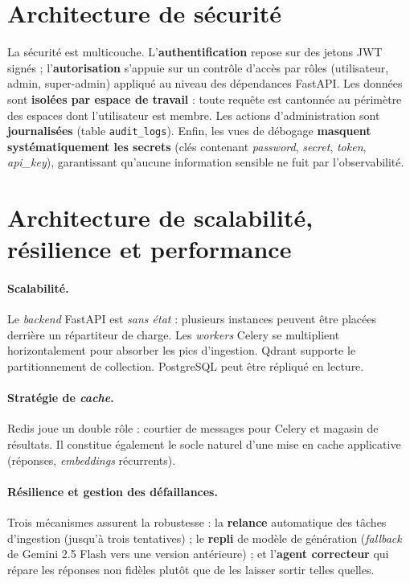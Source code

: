 \documentclass[12pt,a4paper,oneside]{report}
\newcommand{\code}[1]{\texttt{\small #1}}
\begin{document}
\section{Architecture de sécurité}
La sécurité est multicouche. L'\textbf{authentification} repose sur des jetons
JWT signés ; l'\textbf{autorisation} s'appuie sur un contrôle d'accès par rôles
(utilisateur, admin, super-admin) appliqué au niveau des dépendances FastAPI. Les
données sont \textbf{isolées par espace de travail} : toute requête est cantonnée
au périmètre des espaces dont l'utilisateur est membre. Les actions
d'administration sont \textbf{journalisées} (table \code{audit\_logs}). Enfin, les
vues de débogage \textbf{masquent systématiquement les secrets} (clés contenant
\emph{password}, \emph{secret}, \emph{token}, \emph{api\_key}), garantissant
qu'aucune information sensible ne fuit par l'observabilité.

\section{Architecture de scalabilité, résilience et performance}
\paragraph{Scalabilité.} Le \textit{backend} FastAPI est \emph{sans état} :
plusieurs instances peuvent être placées derrière un répartiteur de charge. Les
\emph{workers} Celery se multiplient horizontalement pour absorber les pics
d'ingestion. Qdrant supporte le partitionnement de collection. PostgreSQL peut
être répliqué en lecture.

\paragraph{Stratégie de \emph{cache}.} Redis joue un double rôle : courtier de
messages pour Celery et magasin de résultats. Il constitue également le socle
naturel d'une mise en cache applicative (réponses, \emph{embeddings} récurrents).

\paragraph{Résilience et gestion des défaillances.} Trois mécanismes assurent la
robustesse : la \textbf{relance} automatique des tâches d'ingestion (jusqu'à trois
tentatives) ; le \textbf{repli} de modèle de génération (\emph{fallback} de Gemini
2.5 Flash vers une version antérieure) ; et l'\textbf{agent correcteur} qui répare
les réponses non fidèles plutôt que de les laisser sortir telles quelles.
\end{document}
